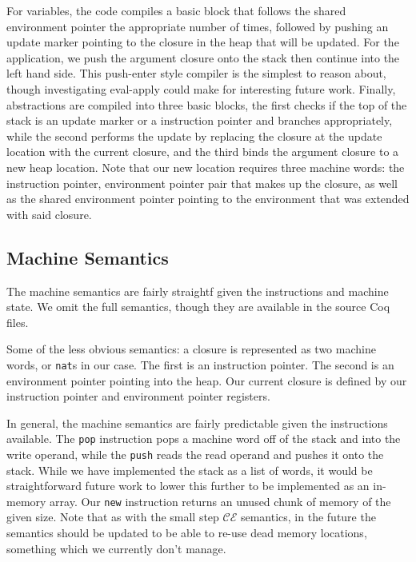 For variables, the code compiles a basic block that follows the shared
environment pointer the appropriate number of times, followed by pushing an
update marker pointing to the closure in the heap that will be updated. For
the application, we push the argument closure onto the stack then continue
into the left hand side. This push-enter style compiler is the simplest to 
reason about, though investigating eval-apply could make for interesting future
work. Finally, abstractions are compiled into three basic blocks, the first checks
if the top of the stack is an update marker or a instruction pointer and branches
appropriately, while the second performs the update by replacing the closure 
at the update location with the current closure, and the third binds the 
argument closure to a new heap location. Note that our new location requires three
machine words: the instruction pointer, environment pointer pair that makes 
up the closure, as well as the shared environment pointer pointing to the 
environment that was extended with said closure. 

\subsection{Machine Semantics}

The machine semantics are fairly straightf given the instructions and
machine state. We omit the full semantics, though they are available in the
source Coq files.

Some of the less obvious semantics: a closure is represented as two machine
words, or \texttt{nat}s in our case. The first is an instruction pointer. The
second is an environment pointer pointing into the heap. Our current closure is
defined by our instruction pointer and environment pointer registers. 

In general, the machine semantics are fairly predictable given the instructions 
available. The \texttt{pop} instruction pops a machine word off of the stack and
into the write operand, while the \texttt{push} reads the read operand and pushes
it onto the stack. While we have implemented the stack as a list of words, it 
would be straightforward future work to lower this further to be implemented as
an in-memory array. Our \texttt{new} instruction returns an unused chunk of
memory of the given size. Note that as with the small step $\mathcal{CE}$ semantics,
in the future the semantics should be updated to be able to re-use dead memory
locations, something which we currently don't manage. 

